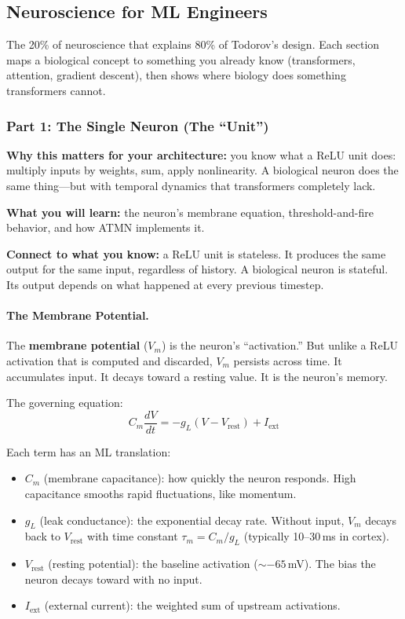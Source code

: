 \documentclass[11pt,a4paper]{article}
\begin{document}

\subsection{Neuroscience for ML Engineers}

The 20\% of neuroscience that explains 80\% of Todorov's design. Each section maps a biological concept to something you already know (transformers, attention, gradient descent), then shows where biology does something transformers cannot.

\subsubsection{Part 1: The Single Neuron (The ``Unit'')}

\textbf{Why this matters for your architecture:} you know what a ReLU unit does: multiply inputs by weights, sum, apply nonlinearity. A biological neuron does the same thing---but with temporal dynamics that transformers completely lack.

\textbf{What you will learn:} the neuron's membrane equation, threshold-and-fire behavior, and how ATMN implements it.

\textbf{Connect to what you know:} a ReLU unit is stateless. It produces the same output for the same input, regardless of history. A biological neuron is stateful. Its output depends on what happened at every previous timestep.

\paragraph{The Membrane Potential.}

The \textbf{membrane potential} ($V_m$) is the neuron's ``activation.'' But unlike a ReLU activation that is computed and discarded, $V_m$ persists across time. It accumulates input. It decays toward a resting value. It is the neuron's memory.

The governing equation:
\[
  C_m \frac{dV}{dt} = -g_L(V - V_{\mathrm{rest}}) + I_{\mathrm{ext}}
\]

Each term has an ML translation:
\begin{itemize}
  \item $C_m$ (membrane capacitance): how quickly the neuron responds. High capacitance smooths rapid fluctuations, like momentum.
  \item $g_L$ (leak conductance): the exponential decay rate. Without input, $V_m$ decays back to $V_{\mathrm{rest}}$ with time constant $\tau_m = C_m / g_L$ (typically 10--30\,ms in cortex).
  \item $V_{\mathrm{rest}}$ (resting potential): the baseline activation (${\sim}{-65}$\,mV). The bias the neuron decays toward with no input.
  \item $I_{\mathrm{ext}}$ (external current): the weighted sum of upstream activations.
\end{itemize}
\end{document}
